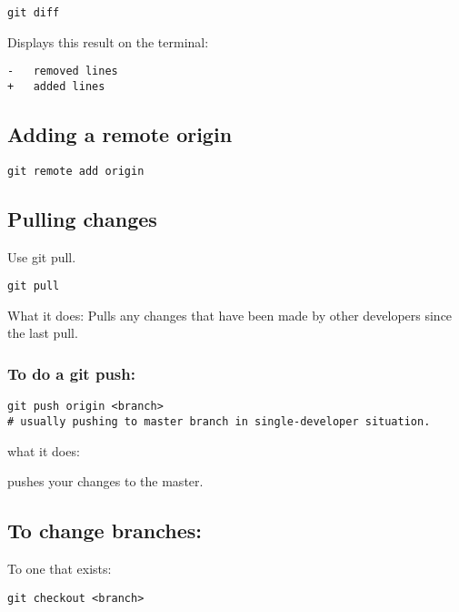 \begin{verbatim}
git diff
\end{verbatim}

Displays this result on the terminal:

\begin{verbatim}
-   removed lines
+   added lines
\end{verbatim}

\subsection{Adding a remote origin}\label{adding-a-remote-origin}

\begin{verbatim}
git remote add origin
\end{verbatim}

\subsection{Pulling changes}\label{pulling-changes}

Use git pull.

\begin{verbatim}
git pull
\end{verbatim}

What it does: Pulls any changes that have been made by other developers
since the last pull.

\subsubsection{To do a git push:}\label{to-do-a-git-push}

\begin{verbatim}
git push origin <branch> 
# usually pushing to master branch in single-developer situation.
\end{verbatim}

what it does:

pushes your changes to the master.

\subsection{To change branches:}\label{to-change-branches}

To one that exists:

\begin{verbatim}
git checkout <branch> 
\end{verbatim}

